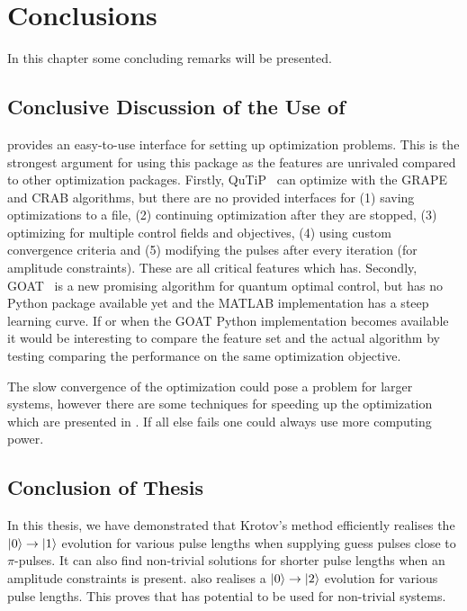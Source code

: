 \documentclass[main.tex]{subfiles}
\begin{document}
\chapter{Conclusions}
In this chapter some concluding remarks will be presented.

\section{Conclusive Discussion of the Use of \krotov{}}
\label{sec:general}
\krotov{} provides an easy-to-use interface for setting up optimization problems.
This is the strongest argument for using this package as the features are unrivaled compared to other optimization packages.
Firstly, QuTiP~\cite{johansson_qutip_2013} can optimize with the GRAPE and CRAB algorithms, but there are no provided interfaces for
(1) saving optimizations to a file,
(2) continuing optimization after they are stopped,
(3) optimizing for multiple control fields and objectives,
(4) using custom convergence criteria and 
(5) modifying the pulses after every iteration (for amplitude constraints).
These are all critical features which \krotov{} has.
Secondly, GOAT~\cite{machnes_gradient_2015} is a new promising algorithm for quantum optimal control, but has no Python package available yet and the MATLAB implementation has a steep learning curve.
If or when the GOAT Python implementation becomes available it would be interesting to compare the feature set and the actual algorithm by testing comparing the performance on the same optimization objective.

The slow convergence of the optimization could pose a problem for larger systems, however there are some techniques for speeding up the optimization which are presented in .
If all else fails one could always use more computing power.

\section{Conclusion of Thesis}
In this thesis, we have demonstrated that Krotov's method efficiently realises the \(\ket{0}\rightarrow\ket{1}\) evolution for various pulse lengths when supplying guess pulses close to \(\pi\)-pulses.
It can also find non-trivial solutions for shorter pulse lengths when an amplitude constraints is present.
\krotov{} also realises a \(\ket{0}\rightarrow\ket{2}\) evolution for various pulse lengths.
This proves that \krotov{} has potential to be used for non-trivial systems.
\end{document}
